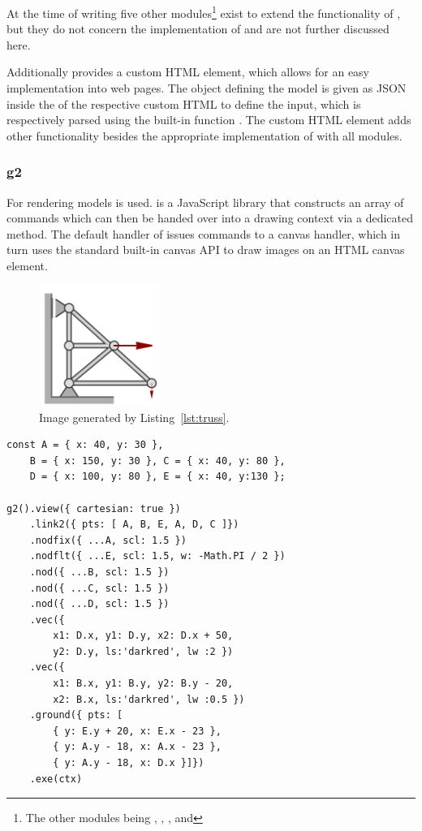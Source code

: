 At the time of writing five other modules\footnote{The other modules being , , ,  and } %
exist to extend the functionality of , but they do not concern the implementation of  and are not further discussed here.

Additionally  provides a custom HTML element, which allows for an easy implementation into web pages.
The object defining the model is given as JSON inside the  of the respective custom HTML to define the input, which is respectively parsed using the built-in function . %
The custom HTML element adds other functionality besides the appropriate implementation of  with all modules.

\subsubsection{g2}

For rendering models  is used. %
 is a JavaScript library that constructs an array of commands which can then be handed over into a drawing context via a dedicated  method.
The default handler of  issues commands to a canvas handler, which in turn uses the standard built-in canvas API to draw images on an HTML canvas element.

\begin{figure}
    \centering
    \includegraphics[width=0.35\textwidth]{images/truss.png}
    \caption{Image generated by Listing~\ref{lst:truss}.}\label{fig:truss}
\end{figure}

\begin{lstlisting}[label={lst:truss}, caption={Example code of a truss defined with g2.}]
const A = { x: 40, y: 30 },
    B = { x: 150, y: 30 }, C = { x: 40, y: 80 },
    D = { x: 100, y: 80 }, E = { x: 40, y:130 };

g2().view({ cartesian: true })
    .link2({ pts: [ A, B, E, A, D, C ]})
    .nodfix({ ...A, scl: 1.5 })
    .nodflt({ ...E, scl: 1.5, w: -Math.PI / 2 })
    .nod({ ...B, scl: 1.5 })
    .nod({ ...C, scl: 1.5 })
    .nod({ ...D, scl: 1.5 })
    .vec({
        x1: D.x, y1: D.y, x2: D.x + 50,
        y2: D.y, ls:'darkred', lw :2 })
    .vec({
        x1: B.x, y1: B.y, y2: B.y - 20,
        x2: B.x, ls:'darkred', lw :0.5 })
    .ground({ pts: [
        { y: E.y + 20, x: E.x - 23 },
        { y: A.y - 18, x: A.x - 23 },
        { y: A.y - 18, x: D.x }]})
    .exe(ctx)
\end{lstlisting}

